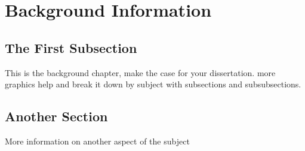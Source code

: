 \pagestyle{plain}
\chapter{Background Information} %
\renewcommand{\thetable}{\arabic{chapter}.\arabic{table}}  
\renewcommand{\thefigure}{\arabic{chapter}.\arabic{figure}} 

\section{The First Subsection}
This is the background chapter, make the case for your dissertation. more graphics help and break it down by subject with subsections and subsubsections.

\section{Another Section}
More information on another aspect of the subject
